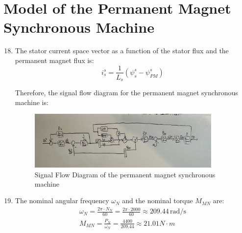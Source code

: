 \documentclass[12pt,a4paper, openany]{book}
\begin{document}
\section{Model of the Permanent Magnet Synchronous Machine}
\begin{enumerate}
    \setcounter{enumi}{17}
    \item 
 The stator current space vector as a function of the stator flux and the permanent magnet flux is:
 \begin{equation}
i^{s}_{s} = \frac{1}{L_s} \left( \psi^{s}_{s} - \psi^{s}_{PM} \right)
\end{equation}
 
Therefore, the signal flow diagram for the permanent magnet synchronous machine is:
\begin{figure}[H]
    \centering
    \includegraphics[width=0.9\textwidth]{figures/SignalFlowDiagram_PMSM.png}
    \caption{Signal Flow Diagram of the permanent magnet synchronous machine}
    \label{fig:Signal Flow Diagram PMSM}
\end{figure}
\item 
The nominal angular frequency $\omega_{N}$ and the nominal torque $M_{MN}$ are:
\begin{equation}
    \begin{aligned}
    \omega_{N} = \frac{2 \pi \cdot N_{N}}{60} 
= \frac{2 \pi \cdot 2000}{60} 
\approx 209.44 \,\text{rad/s}\\
M_{MN} = \frac{P_{N}}{\omega_{N}} 
= \frac{4400}{209.44} 
\approx 21.01 N\cdot m
    \end{aligned}
\end{equation}

\end{enumerate}
\end{document}
